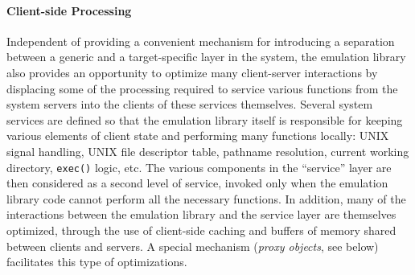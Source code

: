 \paragraph{Client-side Processing}
Independent of providing a convenient mechanism for introducing a
separation between a generic and a target-specific layer in the
system, the emulation library also provides an opportunity to optimize
many client-server interactions by displacing some of the processing
required to service various functions from the system servers into the
clients of these services themselves.  Several system services are
defined so that the emulation library itself is responsible for
keeping various elements of client state and performing many functions
locally: UNIX signal handling, UNIX file descriptor table, pathname
resolution, current working directory, {\tt exec()} logic, etc. The
various components in the ``service'' layer are then considered as a
second level of service, invoked only when the emulation library code
cannot perform all the necessary functions.  In addition, many of the
interactions between the emulation library and the service layer are
themselves optimized, through the use of client-side caching and
buffers of memory shared between clients and servers.  A special
mechanism ({\em proxy objects}, see below) facilitates this type of
optimizations.




